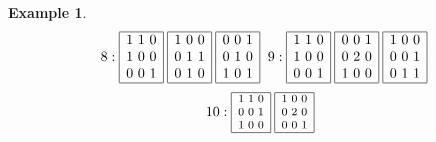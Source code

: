 \documentclass[12pt]{article}
\theoremstyle{definition}
\newtheorem{Example}[Theorem]{Example}
\begin{document}
\begin{Example}
\[{\begin{array}{|c|}
\end{array}
\hspace*{0mm}
\hspace*{2mm}8: 
\begin{array}{|c|}\hline
1\ 1\ 0\\ 1\ 0\ 0\\ 0\ 0\ 1\\ \hline
\end{array}
\hspace*{1mm}
\begin{array}{|c|}\hline
1\ 0\ 0\\ 0\ 1\ 1\\ 0\ 1\ 0\\ \hline
\end{array}
\hspace*{1mm}
\begin{array}{|c|}\hline
0\ 0\ 1\\ 0\ 1\ 0\\ 1\ 0\ 1\\ \hline
\end{array}
\hspace*{0mm}
\hspace*{2mm}9: 
\begin{array}{|c|}\hline
1\ 1\ 0\\ 1\ 0\ 0\\ 0\ 0\ 1\\ \hline
\end{array}
\hspace*{1mm}
\begin{array}{|c|}\hline
0\ 0\ 1\\ 0\ 2\ 0\\ 1\ 0\ 0\\ \hline
\end{array}
\hspace*{1mm}
\begin{array}{|c|}\hline
1\ 0\ 0\\ 0\ 0\ 1\\ 0\ 1\ 1\\ \hline
\end{array}
}\]
\[{\footnotesize
10: 
\begin{array}{|c|}\hline
1\ 1\ 0\\ 0\ 0\ 1\\ 1\ 0\ 0\\ \hline
\end{array}
\hspace*{1mm}
\begin{array}{|c|}\hline
1\ 0\ 0\\ 0\ 2\ 0\\ 0\ 0\ 1\\ \hline

\end{array}}\]
\end{Example}
\end{document}
